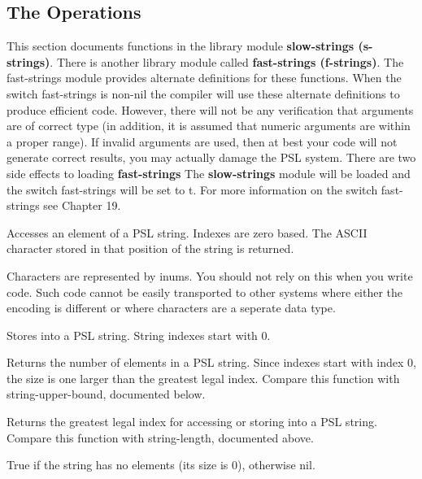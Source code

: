 \subsection{The Operations}

  This   section  documents  functions  in  the  library  module
{\bf slow-strings (s-strings)}. There is another library module called
{\bf fast-strings (f-strings)}. The fast-strings module provides alternate
definitions for these functions.  When the  switch  fast-strings
is  non-nil the compiler will use these alternate definitions to
produce  efficient  code.    However,  there  will  not  be  any
verification that arguments are of correct type (in addition, it
is  assumed  that  numeric arguments are within a proper range).
If invalid arguments are used, then at best your code  will  not
generate  correct  results,  you  may  actually  damage  the PSL
system.  There are two side  effects  to  loading  {\bf fast-strings}
The {\bf slow-strings}  module   will  be  loaded  and  the  switch
fast-strings will be set to t.  For more information on the
switch fast-strings see Chapter 19.


{    Accesses  an  element  of  a  PSL  string.  Indexes are zero
    based.  The ASCII character stored in that position  of  the
    string is returned.
}

    Characters are represented by inums.  You should not rely on
    this  when  you  write  code.    Such  code cannot be easily
    transported to other systems where either  the  encoding  is
    different or where characters are a seperate data type.


{    Stores into a PSL string.  String indexes start with 0.
}

{    Returns  the  number  of  elements  in  a PSL string.  Since
    indexes start with index 0, the size is one larger than  the
    greatest   legal   index.      Compare  this  function  with
    string-upper-bound, documented below.
}

{    Returns the greatest legal index for  accessing  or  storing
    into   a   PSL   string.      Compare   this  function  with
    string-length, documented above.
}

{    True if  the  string  has  no  elements  (its  size  is  0),
    otherwise nil.
}

